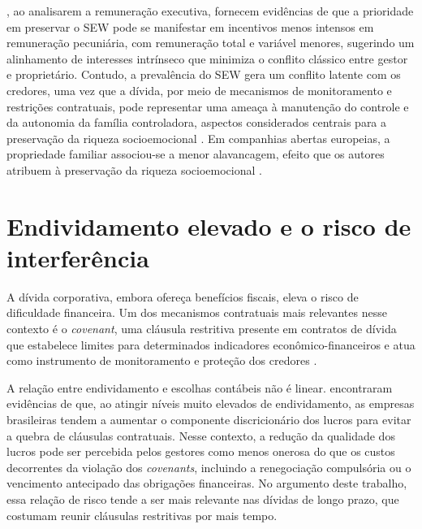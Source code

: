 , ao analisarem a remuneração executiva, fornecem
evidências de que a prioridade em preservar o SEW pode se manifestar em incentivos
menos intensos em remuneração pecuniária, com remuneração total e variável
menores, sugerindo um alinhamento de interesses intrínseco que minimiza o conflito
clássico entre gestor e proprietário. Contudo, a prevalência do SEW gera um
conflito latente com os credores, uma vez que a dívida, por meio de mecanismos de
monitoramento e restrições contratuais, pode representar uma ameaça à manutenção
do controle e da autonomia da família controladora, aspectos considerados centrais
para a preservação da riqueza socioemocional \cite{ames2020,munoz2024}. Em
companhias abertas europeias, a propriedade familiar associou-se a menor
alavancagem, efeito que os autores atribuem à preservação da riqueza
socioemocional \cite{munoz2024}.

\section{Endividamento elevado e o risco de interferência}\label{sec:risco}

A dívida corporativa, embora ofereça benefícios fiscais, eleva o risco de
dificuldade financeira. Um dos mecanismos contratuais mais relevantes nesse
contexto é o \textit{covenant}, uma cláusula restritiva presente em contratos de
dívida que estabelece limites para determinados indicadores
econômico-financeiros e atua como instrumento de monitoramento e proteção dos
credores \cite{costa2018}.

A relação entre endividamento e escolhas contábeis não é linear.
 encontraram evidências de que, ao atingir níveis muito
elevados de endividamento, as empresas brasileiras tendem a aumentar o componente
discricionário dos lucros para evitar a quebra de cláusulas contratuais. Nesse
contexto, a redução da qualidade dos lucros pode ser percebida pelos gestores como
menos onerosa do que os custos decorrentes da violação dos \textit{covenants},
incluindo a renegociação compulsória ou o vencimento antecipado das obrigações
financeiras. No argumento deste trabalho, essa relação de risco tende a ser mais relevante nas
dívidas de longo prazo, que costumam reunir cláusulas restritivas por mais tempo.

